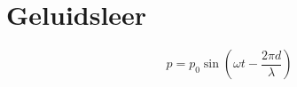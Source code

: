 \newpage
\section{Geluidsleer}
\label{sec:Geluidsleer}

\[ p = p_0 \sin\left(\omega t - \frac{2\pi d}{\lambda}\right) \]